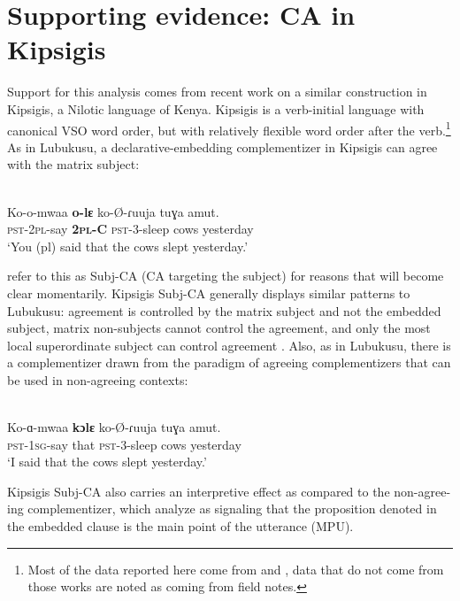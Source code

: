 \documentclass[output=paper
,modfonts
,nonflat
]{langsci/langscibook}
\begin{document}
\section{Supporting evidence: CA in Kipsigis}\label{CA in Kipsigis}

Support for this analysis comes from recent work on a similar construction in Kipsigis, a Nilotic language of Kenya. Kipsigis is a verb-initial language with canonical VSO word order, but with relatively flexible word order after the verb.\footnote{Most of the data reported here come from \citet{Rao:2016} and \citet{DiercksRao:2017}, data that do not come from those works are noted as coming from field notes.} As in Lubukusu, a declarative-embedding complementizer in Kipsigis can agree with the matrix subject: 

\ea \label{BasicKipsigisSubj-CA}
 \\
\gll Ko-o-mwaa \textbf{o-lɛ} ko-\O-ɾuuja tuɣa amut. \\
\textsc{pst}-2\textsc{pl}-say \textbf{2\textsc{pl}-C} \textsc{pst}-3-sleep cows yesterday \\
\glt `You (pl) said that the cows slept yesterday.'

\z
\noindent \citeauthor{DiercksRao:2017} refer to this as Subj-CA (CA targeting the subject) for reasons that will become clear momentarily. Kipsigis Subj-CA generally displays similar patterns to Lubukusu: agreement is controlled by the matrix subject and not the embedded subject, matrix non-subjects cannot control the agreement, and only the most local superordinate subject can control agreement \citep{Rao:2016,DiercksRao:2017}. Also, as in Lubukusu, there is a complementizer drawn from the paradigm of agreeing complementizers that can be used in non-agreeing contexts:   

\ea \label{KipsigisNon-AgreeingCA}
 \\
\gll	Ko-ɑ-mwaa \textbf{kɔlɛ} ko-\O-ɾuuja tuɣa amut. \\
\textsc{pst}-1\textsc{sg}-say that \textsc{pst}-3-sleep cows yesterday \\
\glt `I said that the cows slept yesterday.'
\z

\noindent Kipsigis Subj-CA also carries an interpretive effect as compared to the non-agree-\newline ing complementizer, which \citet{DiercksRao:2017} analyze as signaling that the proposition denoted in the embedded clause is the main point of the utterance (MPU). 
\end{document}

